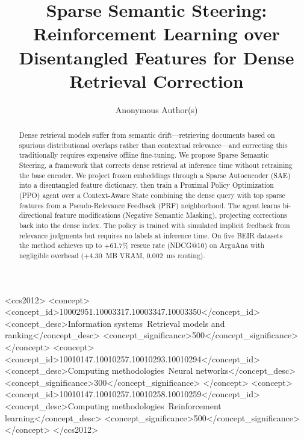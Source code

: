 \documentclass[sigconf]{acmart}
\begin{document}
\title{Sparse Semantic Steering: Reinforcement Learning over Disentangled Features for Dense Retrieval Correction}

\author{Anonymous Author(s)}

\renewcommand{\shortauthors}{Anonymous}

\begin{abstract}
Dense retrieval models suffer from semantic drift---retrieving documents based on spurious distributional overlaps rather than contextual relevance---and correcting this traditionally requires expensive offline fine-tuning. We propose Sparse Semantic Steering, a framework that corrects dense retrieval at inference time without retraining the base encoder. We project frozen embeddings through a Sparse Autoencoder (SAE) into a disentangled feature dictionary, then train a Proximal Policy Optimization (PPO) agent over a Context-Aware State combining the dense query with top sparse features from a Pseudo-Relevance Feedback (PRF) neighborhood. The agent learns bi-directional feature modifications (Negative Semantic Masking), projecting corrections back into the dense index. The policy is trained with simulated implicit feedback from relevance judgments but requires no labels at inference time. On five BEIR datasets the method achieves up to +61.7\% rescue rate (NDCG@10) on ArguAna with negligible overhead (+4.30~MB VRAM, 0.002~ms routing).
\end{abstract}

\begin{CCSXML}
<ccs2012>
 <concept>
  <concept_id>10002951.10003317.10003347.10003350</concept_id>
  <concept_desc>Information systems~Retrieval models and ranking</concept_desc>
  <concept_significance>500</concept_significance>
 </concept>
 <concept>
  <concept_id>10010147.10010257.10010293.10010294</concept_id>
  <concept_desc>Computing methodologies~Neural networks</concept_desc>
  <concept_significance>300</concept_significance>
 </concept>
 <concept>
  <concept_id>10010147.10010257.10010258.10010259</concept_id>
  <concept_desc>Computing methodologies~Reinforcement learning</concept_desc>
  <concept_significance>500</concept_significance>
 </concept>
</ccs2012>
\end{CCSXML}

\end{document}
